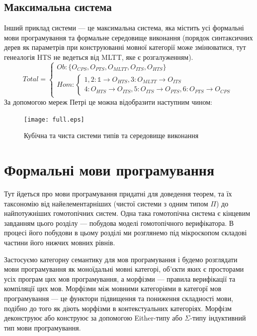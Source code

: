 \subsection{Максимальна система}
Інший приклад системи --- це максимальна система, яка містить усі формальні
мови програмування та формальне середовище виконання (порядок синтаксичних дерев
як параметрів при конструюванні мовної категорії може змінюватися, тут
генеалогія HTS не ведеться від MLTT, яке є розгалуженням).
\begin{equation}
Total = 
\begin{cases}
Ob: \{ O_{CPS}, O_{PTS}, O_{MLTT}, O_{ITS}, O_{HTS} \} \\
Hom: \begin{cases}
1,2: \mathbb{1} \rightarrow O_{HTS}, 3: O_{MLTT} \rightarrow O_{ITS} \\
4: O_{HTS} \rightarrow O_{ITS}, 5: O_{ITS} \rightarrow O_{PTS}, 6: O_{PTS} \rightarrow O_{CPS}
\end{cases}
\end{cases}
\end{equation}
За допомогою мереж Петрі це можна відобразити наступним чином:
\begin{figure}[h]
  \centerline{\texttt{[image: full.eps]}}
  \caption{Кубічна та чиста системи типів та середовище виконання}
\end{figure}

\newpage
\section{Формальні мови програмування}
Тут йдеться про мови програмування придатні для доведення теорем,
та їх таксономію від найелементарніших (чистої системи з одним типом $\Pi$) до
найпотужніших гомотопічних систем. Одна така гомотопічна система є кінцевим завданням
цього розділу --- побудова моделі гомотопічного верифікатора.
В процесі його побудови в цьому розділі ми розглянемо під
мікроскопом складові частини його нижчих мовних рівнів.

Застосуємо категорну семантику для мов програмування і будемо розглядати
мови програмування як моноїдальні мовні категорі, об'єкти яких є просторами
усіх програм цих мов програмування, а морфізми --- правила верифікації та компіляції цих мов.
Морфізми між мовними категоріями в категорї мов програмування --- це
функтори підвищення та пониження складності мови, подібно до того як діють
морфізми в контекстуальних категоріях. Морфізм деконструює або конструює за
допомогою Either-типу або $\Sigma$-типу індуктивний тип мови програмування.

